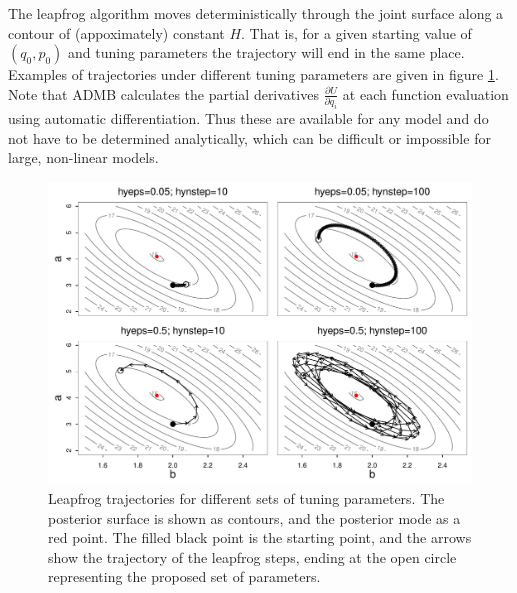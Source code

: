\documentclass{article}\usepackage[]{graphicx}\usepackage[]{color}
\begin{document}
The leapfrog algorithm moves deterministically through the joint surface
along a contour of (appoximately) constant $H$. That is, for a given
starting value of $(q_0,p_0)$ and tuning parameters the trajectory will end
in the same place. Examples of trajectories under different tuning
parameters are given in figure \ref{fig:hybrid_grid_trace}. Note that ADMB
calculates the partial derivatives $\frac{\partial{U}}{\partial{q_i}}$ at
each function evaluation using automatic differentiation. Thus these are
available for any model and do not have to be determined analytically,
which can be difficult or impossible for large, non-linear models.

\begin{figure}[h]
  \centering
  \includegraphics[width=5in]{../plots/hybrid_grid_trace.pdf}
  \caption{Leapfrog trajectories for different sets of tuning
    parameters. The posterior surface is shown as contours, and the
    posterior mode as a red point. The filled black point is the starting
    point, and the arrows show the trajectory of the leapfrog steps, ending
    at the open circle representing the proposed set of parameters.}
  \label{fig:hybrid_grid_trace}
\end{figure}
\end{document}
